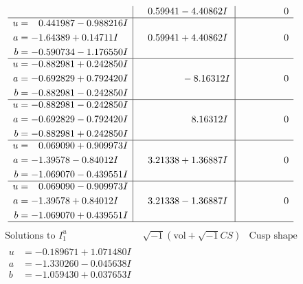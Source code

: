\documentclass[1p]{elsarticle_modified}
\theoremstyle{definition}
\newcommand{\I}{\sqrt{-1}}
\begin{document}
$$\begin{array}{c|c|c}
 & \phantom{-}0.59941 - 4.40862 I & \phantom{-0.000000 } 0 \\ \hline\begin{aligned}
u &= \phantom{-}0.441987 - 0.988216 I \\
a &= -1.64389 + 0.14711 I \\
b &= -0.590734 - 1.176550 I\end{aligned}
 & \phantom{-}0.59941 + 4.40862 I & \phantom{-0.000000 } 0 \\ \hline\begin{aligned}
u &= -0.882981 + 0.242850 I \\
a &= -0.692829 + 0.792420 I \\
b &= -0.882981 - 0.242850 I\end{aligned}
 & \phantom{-0.000000 } -8.16312 I & \phantom{-0.000000 } 0 \\ \hline\begin{aligned}
u &= -0.882981 - 0.242850 I \\
a &= -0.692829 - 0.792420 I \\
b &= -0.882981 + 0.242850 I\end{aligned}
 & \phantom{-0.000000 -}8.16312 I & \phantom{-0.000000 } 0 \\ \hline\begin{aligned}
u &= \phantom{-}0.069090 + 0.909973 I \\
a &= -1.39578 - 0.84012 I \\
b &= -1.069070 - 0.439551 I\end{aligned}
 & \phantom{-}3.21338 + 1.36887 I & \phantom{-0.000000 } 0 \\ \hline\begin{aligned}
u &= \phantom{-}0.069090 - 0.909973 I \\
a &= -1.39578 + 0.84012 I \\
b &= -1.069070 + 0.439551 I\end{aligned}
 & \phantom{-}3.21338 - 1.36887 I & \phantom{-0.000000 } 0\\
 \hline 
 \end{array}$$\newpage$$\begin{array}{c|c|c}  
\text{Solutions to }I^u_{1}& \I (\text{vol} + \sqrt{-1}CS) & \text{Cusp shape}\\
 \hline 
\begin{aligned}
u &= -0.189671 + 1.071480 I \\
a &= -1.330260 - 0.045638 I \\
b &= -1.059430 + 0.037653 I\end{aligned}

\end{array}$$
\end{document}
